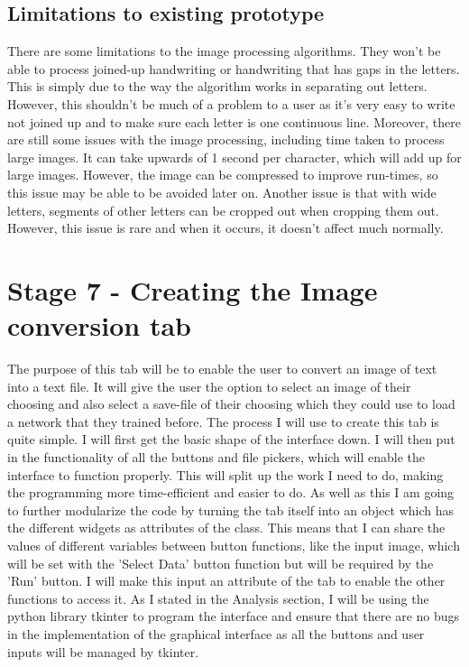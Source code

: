 \documentclass{report}
\begin{document}
\subsection{Limitations to existing prototype}
There are some limitations to the image processing algorithms. They won't be able to process joined-up handwriting or handwriting that has gaps in the letters. This is simply due to the way the algorithm works in separating out letters. However, this shouldn't be much of a problem to a user as it's very easy to write not joined up and to make sure each letter is one continuous line. Moreover, there are still some issues with the image processing, including time taken to process large images. It can take upwards of 1 second per character, which will add up for large images. However, the image can be compressed to improve run-times, so this issue may be able to be avoided later on. Another issue is that with wide letters, segments of other letters can be cropped out when cropping them out. However, this issue is rare and when it occurs, it doesn't affect much normally.
\newpage

\section{Stage 7 - Creating the Image conversion tab}
The purpose of this tab will be to enable the user to convert an image of text into a text file. It will give the user the option to select an image of their choosing and also select a save-file of their choosing which they could use to load a network that they trained before. The process I will use to create this tab is quite simple. I will first get the basic shape of the interface down. I will then put in the functionality of all the buttons and file pickers, which will enable the interface to function properly. This will split up the work I need to do, making the programming more time-efficient and easier to do. As well as this I am going to further modularize the code by turning the tab itself into an object which has the different widgets as attributes of the class. This means that I can share the values of different variables between button functions, like the input image, which will be set with the 'Select Data' button function but will be required by the 'Run' button. I will make this input an attribute of the tab to enable the other functions to access it. As I stated in the Analysis section, I will be using the python library tkinter to program the interface and ensure that there are no bugs in the implementation of the graphical interface as all the buttons and user inputs will be managed by tkinter. 
\end{document}
